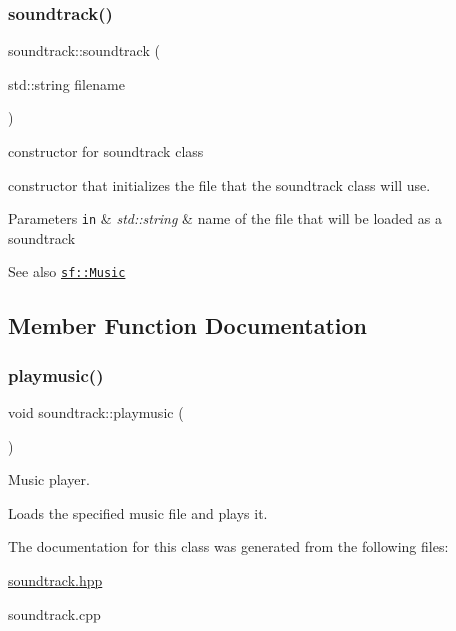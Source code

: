 \subsubsection{\texorpdfstring{soundtrack()}{soundtrack()}}
{\footnotesize\ttfamily soundtrack\+::soundtrack (\begin{DoxyParamCaption}\item[{std\+::string}]{filename }\end{DoxyParamCaption})}



constructor for soundtrack class 

constructor that initializes the file that the soundtrack class will use.


\begin{DoxyParams}[1]{Parameters}
\mbox{\tt in}  & {\em std\+::string} & name of the file that will be loaded as a soundtrack\\
\hline
\end{DoxyParams}
\begin{DoxySeeAlso}{See also}
\href{http://www.sfml-dev.org/documentation/2.0/classsf_1_1Music.php}{\tt sf\+::\+Music} 
\end{DoxySeeAlso}


\subsection{Member Function Documentation}
\mbox{\label{classsoundtrack_a7569a4c0cde86548197756b8e05cf464}} 
\subsubsection{\texorpdfstring{playmusic()}{playmusic()}}
{\footnotesize\ttfamily void soundtrack\+::playmusic (\begin{DoxyParamCaption}{ }\end{DoxyParamCaption})}



Music player. 

Loads the specified music file and plays it. 

The documentation for this class was generated from the following files\+:\begin{DoxyCompactItemize}
\item 
\hyperlink{soundtrack_8hpp}{soundtrack.\+hpp}\item 
soundtrack.\+cpp\end{DoxyCompactItemize}
